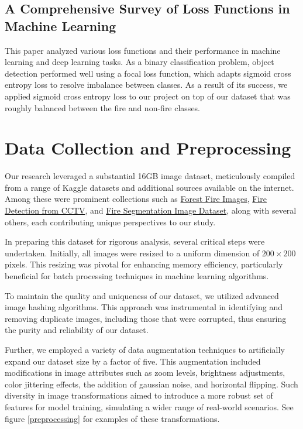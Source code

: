 \subsection{A Comprehensive Survey of Loss Functions in Machine Learning~\citep{Wang2022}}

This paper analyzed various loss functions and their performance in machine learning and deep learning tasks. As a binary classification problem, object detection performed well using a focal loss function, which adapts sigmoid cross entropy loss to resolve imbalance between classes. As a result of its success, we applied sigmoid cross entropy loss to our project on top of our dataset that was roughly balanced between the fire and non-fire classes.

\section{Data Collection and Preprocessing}

Our research leveraged a substantial 16GB image dataset, meticulously compiled from a range of Kaggle datasets and additional sources available on the internet. Among these were prominent collections such as \href{https://www.kaggle.com/datasets/mohnishsaiprasad/forest-fire-images}{Forest Fire Images}, \href{https://www.kaggle.com/datasets/ritupande/fire-detection-from-cctv}{Fire Detection from CCTV}, and \href{https://www.kaggle.com/datasets/diversisai/fire-segmentation-image-dataset}{Fire Segmentation Image Dataset}, along with several others, each contributing unique perspectives to our study.

In preparing this dataset for rigorous analysis, several critical steps were undertaken. Initially, all images were resized to a uniform dimension of \(200 \times 200\) pixels. This resizing was pivotal for enhancing memory efficiency, particularly beneficial for batch processing techniques in machine learning algorithms.

To maintain the quality and uniqueness of our dataset, we utilized advanced image hashing algorithms. This approach was instrumental in identifying and removing duplicate images, including those that were corrupted, thus ensuring the purity and reliability of our dataset.

Further, we employed a variety of data augmentation techniques to artificially expand our dataset size by a factor of five. This augmentation included modifications in image attributes such as zoom levels, brightness adjustments, color jittering effects, the addition of gaussian noise, and horizontal flipping. Such diversity in image transformations aimed to introduce a more robust set of features for model training, simulating a wider range of real-world scenarios. See figure \ref{preprocessing} for examples of these transformations.

